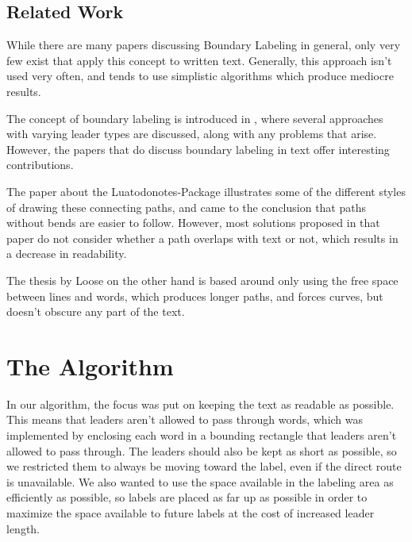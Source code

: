 \documentclass[11pt,a4paper]{vutinfth}
\begin{document}

\section{Related Work}

While there are many papers discussing Boundary Labeling in general, only very few exist that apply this concept to written text. Generally, this approach isn't used very often, and tends to use simplistic algorithms which produce mediocre results. %

The concept of boundary labeling is introduced in \cite{Bekos2007}, where several approaches with varying leader types are discussed, along with any problems that arise. 
However, the papers that do discuss boundary labeling in text offer interesting contributions.

The paper about the Luatodonotes-Package\cite{Kindermann2014} illustrates some of the different styles of drawing these connecting paths, and came to the conclusion that paths without bends are easier to follow. %
However, most solutions proposed in that paper do not consider whether a path overlaps with text or not, which results in a decrease in readability.

The thesis by Loose\cite{Loose2015} on the other hand is based around only using the free space between lines and words, which produces longer paths, and forces curves, but doesn't obscure any part of the text.


\chapter{The Algorithm}

In our algorithm, the focus was put on keeping the text as readable as possible. This means that leaders aren't allowed to pass through words, which was implemented by enclosing each word in a bounding rectangle that leaders aren't allowed to pass through.
The leaders should also be kept as short as possible, so we restricted them to always be moving toward the label, even if the direct route is unavailable.%
We also wanted to use the space available in the labeling area as efficiently as possible, so labels are placed as far up as possible in order to maximize the space available to future labels at the cost of increased leader length.
\end{document}
